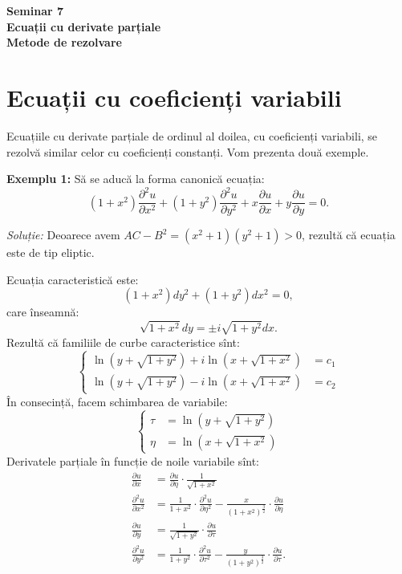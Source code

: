 \documentclass[11pt,a4paper]{article}
\theoremstyle{dotless}
\theoremstyle{dotlessdr}
\begin{document}

\begin{center}
  {\large\textbf{Seminar 7 \\
      Ecuații cu derivate parțiale \\
      Metode de rezolvare}}
\end{center}

\vspace{2cm}

\section{Ecuații cu coeficienți variabili}

\indent\indent Ecuațiile cu derivate parțiale de ordinul al doilea, cu coeficienți variabili,
se rezolvă similar celor cu coeficienți constanți. Vom prezenta două exemple.

\textbf{Exemplu 1:} Să se aducă la forma canonică ecuația:
\[
  (1 + x^2)\frac{\partial^2 u}{\partial x^2} + %
  (1 + y^2)\frac{\partial^2 u}{\partial y^2} + %
  x \frac{\partial u}{\partial x} + y \frac{\partial u}{\partial y} = 0.
\]

\emph{Soluție:} Deoarece avem $ AC - B^2 = (x^2 + 1)(y^2 + 1) > 0 $, rezultă
că ecuația este de tip eliptic.

Ecuația caracteristică este:
\[
  (1 + x^2)dy^2 + (1 + y^2) dx^2 = 0,
\]
care înseamnă:
\[
  \sqrt{1 + x^2} dy = \pm i \sqrt{1 + y^2} dx.
\]
Rezultă că familiile de curbe caracteristice sînt:
\[
  \begin{cases}
    \ln(y + \sqrt{1 + y^2}) + i \ln(x + \sqrt{1 + x^2}) &= c_1 \\
    \ln(y + \sqrt{1 + y^2}) - i \ln(x + \sqrt{1 + x^2}) &= c_2
  \end{cases}
\]
În consecință, facem schimbarea de variabile:
\[
  \begin{cases}
    \tau &= \ln(y + \sqrt{1 + y^2}) \\
    \eta &= \ln(x + \sqrt{1 + x^2})
  \end{cases}
\]
Derivatele parțiale în funcție de noile variabile sînt:
\begin{align*}
  \frac{\partial u}{\partial x} &= \frac{\partial u}{\partial \eta} \cdot %
                                  \frac{1}{\sqrt{1 + x^2}} \\
  \frac{\partial^2 u}{\partial x^2} &= \frac{1}{1 + x^2} \cdot \frac{\partial^2 u}{\partial \eta^2}%
                                      - \frac{x}{(1 + x^2)^{\frac{3}{2}}} \cdot %
                                      \frac{\partial u}{\partial \eta} \\
  \frac{\partial u}{\partial y} &= \frac{1}{\sqrt{1 + y^2}} \cdot \frac{\partial u}{\partial \tau} \\
  \frac{\partial^2 u}{\partial y^2} &= \frac{1}{1 + y^2} \cdot \frac{\partial^2 u}{\partial \tau^2}%
                                      - \frac{y}{(1 + y^2)^{\frac{3}{2}}} \cdot %
                                      \frac{\partial u}{\partial \tau}.
\end{align*}
\end{document}
